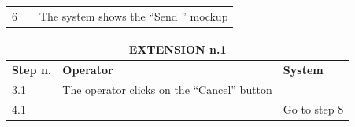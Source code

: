 {{{\begin{table}[h]
\begin{tabular}{|p{2cm}|p{6cm}|p{6cm}|}
				\vspace{1mm} \vspace{1mm} \\
			\hline
				\vspace{1mm} 6 \vspace{1mm} &
				\vspace{1mm} \vspace{1mm} & 
				\vspace{1mm} The system shows the “Send ” mockup \vspace{1mm} \\
			\hline	
			\end{tabular}
			\end{table}
			
			\begin{table}[h]
			\begin{tabular}{|p{2cm}|p{6cm}|p{6cm}|}
			\hline
				\multicolumn{3}{|c|}{EXTENSION n.1} \\
			\hline
				\centering \vspace{1mm} \bfseries{Step n.} \vspace{1mm} & \vspace{1mm} \bfseries{Operator} \vspace{1mm} & \vspace{1mm} \bfseries{System} \vspace{1mm}\\
			\hline
				\vspace{1mm} 3.1 \vspace{1mm} &
				\vspace{1mm} The operator clicks on the “Cancel” button \vspace{1mm} & 
				\vspace{1mm} \vspace{1mm} \\
			\hline
				\vspace{1mm} 4.1 \vspace{1mm} &
				\vspace{1mm} \vspace{1mm} & 
				\vspace{1mm} Go to step 8\vspace{1mm} \\
			\hline
			\end{tabular}
			\end{table}

}}}
